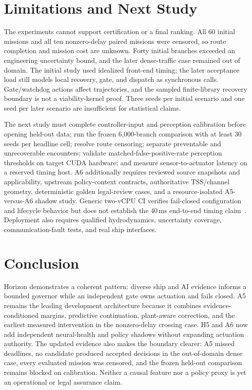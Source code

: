 \documentclass[sigconf,nonacm]{acmart}
\begin{document}
\section{Limitations and Next Study}
The experiments cannot support certification or a final ranking. All 60 initial missions and all ten nonzero-delay paired missions were censored, so route completion and mission cost are unknown. Forty initial branches exceeded an engineering uncertainty bound, and the later dense-traffic case remained out of domain. The initial study used idealized front-end timing; the later acceptance load still models local recovery, gate, and dispatch as synchronous calls. Gate/watchdog actions affect trajectories, and the sampled finite-library recovery boundary is not a viability-kernel proof. Three seeds per initial scenario and one seed per later scenario are insufficient for statistical claims.

The next study must complete controller-input and perception calibration before opening held-out data; run the frozen 6,000-branch comparison with at least 30 seeds per headline cell; resolve route censoring; separate preventable and unrecoverable encounters; validate matched-false-positive-rate perception thresholds on target CUDA hardware; and measure sensor-to-actuator latency on a reserved timing host. A6 additionally requires reviewed source snapshots and applicability, upstream policy-context contracts, authoritative TSS/channel geometry, deterministic golden legal-review cases, and a resource-isolated A5-versus-A6 shadow study. Generic two-vCPU CI verifies fail-closed configuration and lifecycle behavior but does not establish the 40\,ms end-to-end timing claim~\cite{ci}. Deployment also requires qualified hydrodynamics, uncertainty coverage, communication-fault tests, and real ship interfaces.

\section{Conclusion}
Horizon demonstrates a coherent pattern: diverse ship and AI evidence informs a bounded governor while an independent gate owns actuation and fails closed. A5 remains the leading development architecture because it combines evidence-conditioned margins, predictive continuation, plant-aware correction, and the earliest measured intervention in the nonzero-delay crossing case. H5 and A6 now add independent neural-health and policy shadows without expanding actuation authority. The updated evidence also makes the boundary clearer: A5 missed deadlines, no candidate produced accepted decisions in the out-of-domain dense case, every evaluated mission was censored, and the frozen held-out comparison remains blocked on calibration. Neither a causal feature nor a policy proxy is yet an operational or legal assurance claim.
\end{document}
